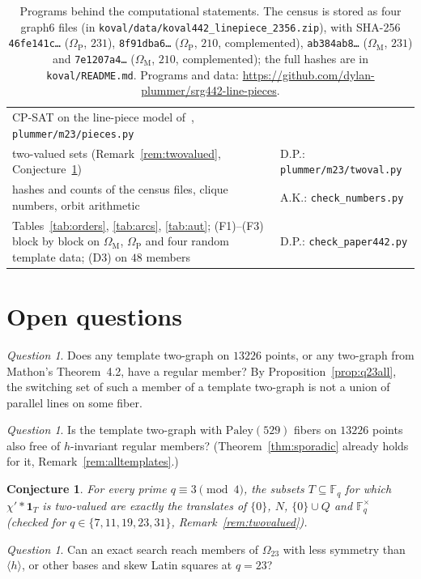 \documentclass[11pt]{amsart}
\newtheorem{conjecture}[theorem]{Conjecture}
\theoremstyle{definition}
\theoremstyle{remark}
\newtheorem{question}[theorem]{Question}
\newcommand{\F}{\mathbb{F}}
\newcommand{\Pal}{\mathrm{Paley}}
\newcommand{\one}{\mathbf 1}
\newcommand{\code}[1]{\texttt{#1}}
\newcommand{\OM}{\Omega_{\mathrm M}}   %
\newcommand{\OP}{\Omega_{\mathrm P}}   %
\begin{document}
\begin{table}[!ht]
\begin{tabular}{p{}p{}}
CP-SAT on the line-piece model of~\cite{Plummer442}, \code{plummer/m23/pieces.py}\\
two-valued sets (Remark~\ref{rem:twovalued}, Conjecture~\ref{conj:twoval}) & D.P.: \code{plummer/m23/twoval.py}\\
hashes and counts of the census files, clique numbers, orbit arithmetic & A.K.: \code{check\_numbers.py}\\
Tables~\ref{tab:orders}, \ref{tab:arcs}, \ref{tab:aut}; (F1)--(F3) block by block on $\OM$, $\OP$ and four random template data; (D3) on $48$ members & D.P.: \code{check\_paper442.py}\\
\bottomrule
\end{tabular}
\caption{Programs behind the computational statements. The census is stored as four graph6 files (in
\code{koval/data/koval442\_linepiece\_2356.zip}), with SHA-256 \code{46fe141c\ldots} ($\OP$, $231$), \code{8f91dba6\ldots}
($\OP$, $210$, complemented), \code{ab384ab8\ldots} ($\OM$, $231$) and \code{7e1207a4\ldots} ($\OM$, $210$, complemented);
the full hashes are in \code{koval/README.md}. Programs and data:
\url{https://github.com/dylan-plummer/srg442-line-pieces}.}
\label{tab:programs}
\end{table}
\FloatBarrier

\section{Open questions}\label{sec:open}
\begin{question}
Does any template two-graph on $13226$ points, or any two-graph from Mathon's Theorem~4.2, have a regular member? By
Proposition~\ref{prop:q23all}, the switching set of such a member of a template two-graph is not a union of parallel
lines on some fiber.
\end{question}
\begin{question}
Is the template two-graph with $\Pal(529)$ fibers on $13226$ points also free of $h$-invariant regular members?
(Theorem~\ref{thm:sporadic} already holds for it, Remark~\ref{rem:alltemplates}.)
\end{question}
\begin{conjecture}\label{conj:twoval}
For every prime $q\equiv3\pmod4$, the subsets $T\subseteq\F_q$ for which $\chi'*\one_T$ is two-valued are exactly the
translates of $\{0\}$, $N$, $\{0\}\cup Q$ and $\F_q^\times$ (checked for $q\in\{7,11,19,23,31\}$, Remark~\ref{rem:twovalued}).
\end{conjecture}
\begin{question}
Can an exact search reach members of $\Omega_{23}$ with less symmetry than $\langle h\rangle$, or other bases and skew Latin
squares at $q=23$?
\end{question}
\end{document}
